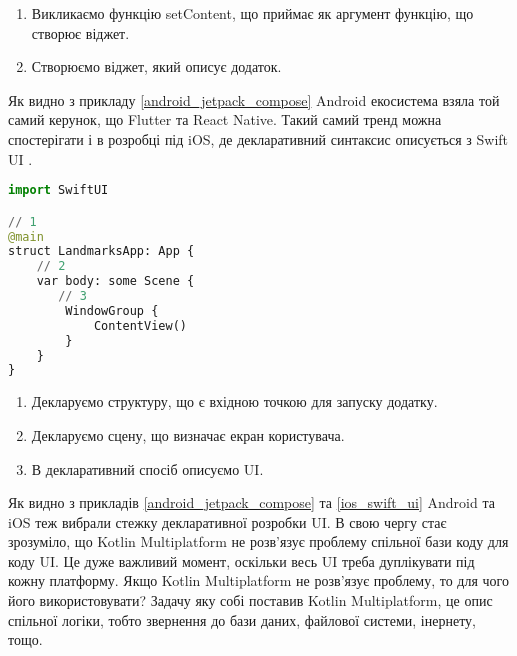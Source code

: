 \begin{enumerate}
    \item Викликаємо функцію setContent, що приймає як аргумент функцію, що створює віджет.
    \item Створюємо віджет, який описує додаток.
\end{enumerate}

Як видно з прикладу \ref{android_jetpack_compose} Android екосистема взяла той самий керунок, що Flutter та React Native.
Такий самий тренд можна спостерігати і в розробці під iOS, де декларативний синтаксис описується з Swift UI \cite{swift_ui}.

\begin{lstlisting}[style=light, language=Python,label={lst:ios_swift_ui},caption=Swift UI]
import SwiftUI

// 1
@main
struct LandmarksApp: App {
    // 2
    var body: some Scene {
       // 3
        WindowGroup {
            ContentView()
        }
    }
}
\end{lstlisting}

\begin{enumerate}
    \item Декларуємо структуру, що є вхідною точкою для запуску додатку.
    \item Декларуємо сцену, що визначає екран користувача.
    \item В декларативний спосіб описуємо UI.
\end{enumerate}

Як видно з прикладів \ref{android_jetpack_compose} та \ref{ios_swift_ui} Android та iOS теж вибрали стежку декларативної розробки UI.
В свою чергу стає зрозуміло, що Kotlin Multiplatform не розв'язує проблему спільної бази коду для коду UI.
Це дуже важливий момент, оскільки весь UI треба дуплікувати під кожну платформу.
Якщо Kotlin Multiplatform не розв'язує проблему, то для чого його використовувати?
Задачу яку собі поставив Kotlin Multiplatform, це опис спільної логіки, тобто звернення до бази даних, файлової системи, інернету, тощо.
